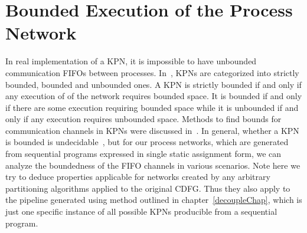 \section{Bounded Execution of the Process Network}
In real implementation of a KPN, 
it is impossible to have unbounded communication FIFOs between
processes. In~\cite{boundedwrite}, KPNs are 
categorized into strictly bounded, bounded and unbounded ones.
A KPN is strictly bounded if and only if any execution of of the network requires bounded space. It is bounded if and only if there are some
execution requiring bounded space while it is unbounded if and only if any
execution requires unbounded space. Methods to find bounds for communication channels
in KPNs were discussed in~\cite{boundedwrite}\cite{Geilen:2003:REK:1765712.1765736}. In general, whether a
KPN is bounded is undecidable~\cite{Buck:1993:SDD:921086}, but for our process networks, which
are generated from sequential programs expressed in single static assignment
form, we can analyze the boundedness of the FIFO channels in various
scenarios. Note here we try to deduce properties applicable for
networks created by any arbitrary partitioning algorithms applied to
the original CDFG. Thus they also apply to the pipeline generated
using method outlined in chapter~\ref{decoupleChap}, which is just
one specific instance of all possible KPNs producible from a sequential program.


